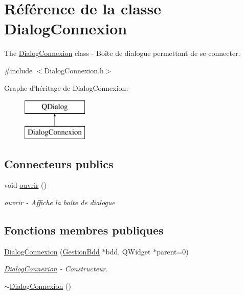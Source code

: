 \hypertarget{class_dialog_connexion}{\section{Référence de la classe Dialog\-Connexion}
\label{class_dialog_connexion}
}


The \hyperlink{class_dialog_connexion}{Dialog\-Connexion} class -\/ Boîte de dialogue permettant de se connecter.  




{\ttfamily \#include $<$Dialog\-Connexion.\-h$>$}

Graphe d'héritage de Dialog\-Connexion\-:\begin{figure}[H]
\begin{center}
\leavevmode
\includegraphics[height=2.000000cm]{class_dialog_connexion}
\end{center}
\end{figure}
\subsection*{Connecteurs publics}
\begin{DoxyCompactItemize}
\item 
void \hyperlink{class_dialog_connexion_aef2d318cc32047ad6c5f7048cc8fb312}{ouvrir} ()
\begin{DoxyCompactList}\small\item\em ouvrir -\/ Affiche la boîte de dialogue \end{DoxyCompactList}\end{DoxyCompactItemize}
\subsection*{Fonctions membres publiques}
\begin{DoxyCompactItemize}
\item 
\hyperlink{class_dialog_connexion_ab104195df6defa3939318919ec495d52}{Dialog\-Connexion} (\hyperlink{class_gestion_bdd}{Gestion\-Bdd} $\ast$bdd, Q\-Widget $\ast$parent=0)
\begin{DoxyCompactList}\small\item\em \hyperlink{class_dialog_connexion}{Dialog\-Connexion} -\/ Constructeur. \end{DoxyCompactList}\item 
\hyperlink{class_dialog_connexion_a1fd101a3631e09a5f87c201960fa61c1}{$\sim$\-Dialog\-Connexion} ()
\end{DoxyCompactItemize}



